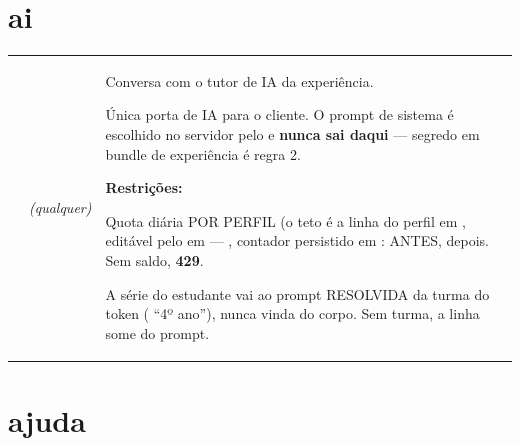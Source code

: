 \section{ai}

\begin{tabularx}{\linewidth}{@{}L{40mm}L{24mm}X@{}}
\toprule
\headrow {} &  & \\
\midrule
\endhead
{} & \emph{(qualquer)} & Conversa com o tutor de IA da experiência.\par Única porta de IA para o cliente. O prompt de sistema é escolhido no servidor pelo  e \textbf{nunca sai daqui} --- segredo em bundle de experiência é regra 2.\par \textbf{Restrições:}\par \hspace*{1em}\textbullet{} Quota diária POR PERFIL (o teto é a linha do perfil em , editável pelo  em  --- , contador persistido em :  ANTES,  depois. Sem saldo, \textbf{429}.\par \hspace*{1em}\textbullet{} A série do estudante vai ao prompt RESOLVIDA da turma do token ( \seta{} \enquote{4º ano}), nunca vinda do corpo. Sem turma, a linha some do prompt.\\
\bottomrule
\end{tabularx}

\section{ajuda}


